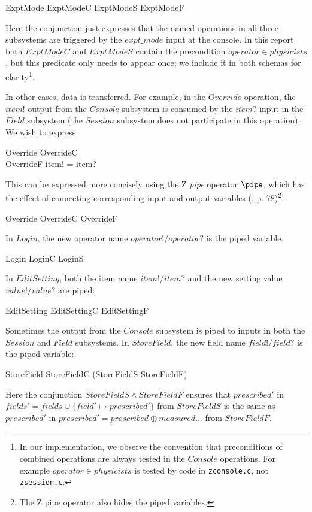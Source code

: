 \documentclass{article}
\begin{document}
\begin{zed} ExptMode  ExptModeC \land ExptModeS \land ExptModeF \end{zed}
Here the conjunction just expresses that the named operations in all
three subsystems are triggered by the $expt\_mode$ input at the
console.  In this report both $ExptModeC$ and $ExptModeS$ contain the
precondition $operator \in physicists$, but this predicate only needs
to appear once; we include it in both schemas for clarity\footnote{In our
implementation, we observe the convention that preconditions of
combined operations are always tested in the $Console$
operations.  For example $operator \in physicists$
is tested by code in {\tt zconsole.c}, not {\tt zsession.c}.}.

In other cases, data is transferred.  For example, in the $Override$
operation, the $item!$ output from the $Console$ subsystem is
consumed by the $item?$ input in the $Field$ subsystem (the $Session$
subsystem does not participate in this operation).  We wish to
express

\begin{schema}{Override}
	OverrideC \\
	OverrideF
\where
	item! = item?
\end{schema}
This can be expressed more concisely using the Z {\em pipe} operator
$\pipe$, which has the effect of connecting corresponding input and
output variables (\cite{spivey92}, p. 78)\footnote{The Z pipe operator
also hides the piped variables.}.

\begin{zed} Override  OverrideC \pipe OverrideF \end{zed}
In $Login$, the new operator name $operator!/operator?$ is the piped variable.

\begin{zed} Login  LoginC \pipe LoginS \end{zed}
In $EditSetting$, both the item name $item!/item?$ and the
new setting value $value!/value?$ are piped:

\begin{zed} EditSetting  EditSettingC \pipe EditSettingF \end{zed}
Sometimes the output from the $Console$ subsystem is piped to inputs in
both the $Session$ and $Field$ subsystems.  In $StoreField$, the new
field name $field! / field?$ is the piped variable:

\begin{zed} 
	StoreField  StoreFieldC \pipe (StoreFieldS \land StoreFieldF)
\end{zed}
Here the conjunction $StoreFieldS \land StoreFieldF$ ensures that
$prescribed'$ in $fields' = fields \cup \{ field' \mapsto prescribed' \}$ 
from $StoreFieldS$ is the same as $prescribed'$ in
$prescribed' = prescribed \oplus  measured \dots$ from $StoreFieldF$.
\end{document}
